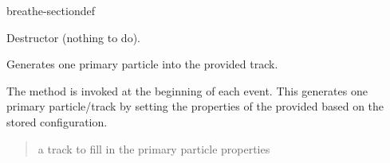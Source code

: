\documentclass[letterpaper,10pt,english]{sphinxmanual}
\begin{document}
\begin{fulllineitems}
\begin{sphinxuseclass}{breathe-sectiondef}
\begin{fulllineitems}
\end{fulllineitems}


\begin{fulllineitems}
\label{\detokenize{Simulation/SimulationCodeDoc:_CPPv4N16PrimaryGeneratorD0Ev}}
\pysigstartsignatures
\pysigstartmultiline
{}
\pysigstopmultiline
\pysigstopsignatures
\sphinxAtStartPar
Destructor (nothing to do). 

\end{fulllineitems}


\begin{fulllineitems}
\label{\detokenize{Simulation/SimulationCodeDoc:_CPPv4N16PrimaryGenerator11GenerateOneER12G4HepEmTrack}}
\pysigstartsignatures
\pysigstartmultiline
{}
\pysigstopmultiline
\pysigstopsignatures
\sphinxAtStartPar
Generates one primary particle into the provided track. 

\sphinxAtStartPar
The  method is invoked at the beginning of each event. This generates one primary particle/track by setting the properties of the provided  based on the stored configuration.

\sphinxAtStartPar
\begin{quote}\begin{description}
\sphinxAtStartPar
\sphinxstylestrong{{[}inout{]}} a track to fill in the primary particle properties 


\end{description}
\end{quote}
\end{fulllineitems}
\end{sphinxuseclass}
\end{fulllineitems}
\end{document}
